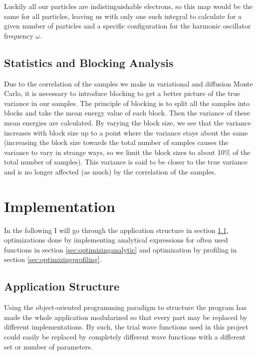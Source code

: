 \documentclass[aps,prb,twocolumn,floatfix]{revtex4}
\begin{document}
Luckily all our particles are indistinguishable electrons, so this map would be the same for all particles, leaving us with only one such integral to calculate for a given number of particles and a specific configuration for the harmonic oscillator frequency $\omega$.


\subsection{Statistics and Blocking Analysis} \label{sec:blocking}

Due to the correlation of the samples we make in variational and diffusion Monte Carlo, it is necessary to introduce blocking to get a better picture of the true variance in our samples. The principle of blocking is to split all the samples into blocks and take the mean energy value of each block. Then the variance of these mean energies are calculated. By varying the block size, we see that the variance increases with block size up to a point where the variance stays about the same (increasing the block size towards the total number of samples causes the variance to vary in strange ways, so we limit the block sizes to about 10\% of the total number of samples). This variance is said to be closer to the true variance and is no longer affected (as much) by the correlation of the samples.\cite{lecturenotes}

\section{Implementation} \label{sec:implementation}

In the following I will go through the application structure in section \ref{sec:applicationstructure}, optimizations done by implementing analytical expressions for often used functions in section \ref{sec:optimizinganalytic} and optimization by profiling in section \ref{sec:optimizingprofiling}.

\subsection{Application Structure} \label{sec:applicationstructure}

Using the object-oriented programming paradigm to structure the program has made the whole application modularized so that every part may be replaced by different implementations. By such, the trial wave functions used in this project could easily be replaced by completely different wave functions with a different set or number of parameters.
\end{document}
